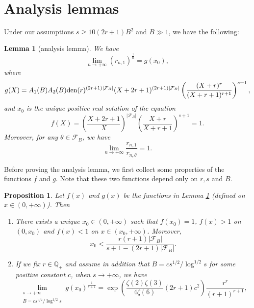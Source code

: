 \documentclass[11pt]{amsart}
\newtheorem{lemma}[theorem]{Lemma}
\newtheorem{proposition}[theorem]{Proposition}
\numberwithin{equation}{section}
\begin{document}
\section{Analysis lemmas}
\label{Analysis_lemmas}

Under our assumptions $s \geqslant  10(2r+1)B^2$ and $B \gg 1$, we have the following:

\smallskip
\begin{lemma}[analysis lemma]\label{LemmaAna}
We have
\[\lim_{n \rightarrow +\infty} \left(r_{n,1}\right)^{\frac{1}{n}} = g(x_0) ,\]
where
\[g(X) = A_1(B)A_2(B) {\rm den}(r)^{(2r+1)|\mathcal{F}_B|} (X+2r+1)^{(2r+1)|\mathcal{F}_B|} \left( \frac{(X+r)^r}{(X+r+1)^{r+1}} \right)^{s+1},\]
and $x_0$ is the unique positive real solution of the equation
\[f(X) = \left( \frac{X+2r+1}{X} \right)^{|\mathcal{F}_B|} \left( \frac{X+r}{X+r+1} \right)^{s+1} = 1.\]
Moreover, for any $\theta \in \mathcal{F}_B$, we have
\[\lim_{n \rightarrow +\infty} \frac{r_{n,1}}{r_{n,\theta}} = 1.\]
\end{lemma}
\smallskip

Before proving the analysis lemma, we first collect some properties of the functions $f$ and $g$. Note that these two functions depend only on $r,s$ and $B$.

\smallskip
\begin{proposition}\label{g_x_0}
Let $f(x)$ and $g(x)$ be the functions in Lemma \ref{LemmaAna} (defined on $x \in (0,+\infty)$). Then
\begin{enumerate}
\item[(1)] There exists a unique $x_0 \in (0,+\infty)$ such that $f(x_0) = 1$, $f(x) > 1$ on $(0,x_0)$ and $f(x) < 1$ on $x \in (x_0,+\infty)$. Moreover,
    \[ x_0 < \frac{r(r+1)|\mathcal{F}_B|}{s+1 - (2r+1)|\mathcal{F}_B|} .\]
\item[(2)] If we fix $r \in \mathbb{Q}_{+}$ and assume in addition that $B = cs^{1/2}/\log^{1/2} s$ for some positive constant $c$, when $s \rightarrow +\infty$, we have
    \[ \lim_{\substack{s \rightarrow +\infty \\ B = cs^{1/2}/\log^{1/2} s}} g(x_0)^{\frac{1}{s+1}} = \exp\left( \frac{\zeta(2)\zeta(3)}{4\zeta(6)}(2r+1)c^2 \right) \frac{r^r}{(r+1)^{r+1}} ,\]
\end{enumerate}
\end{proposition}
\end{document}
